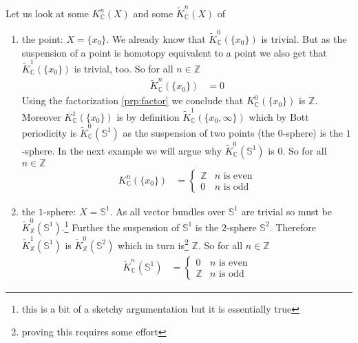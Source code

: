 \begin{exa}
\label{exa:kgrstandard}
Let us look at some $K_{\mathbb{C}}^{n}(X)$ and some $\tilde{K}_{\mathbb{C}}^{n}(X)$ of
\begin{enumerate}
\item
the point: $X = \lbrace x_{0} \rbrace$. We already know that $\tilde{K}_{\mathbb{C}}^{0}(\lbrace x_{0} \rbrace)$ is trivial. But as the suspension of a point is homotopy equivalent to a point we also get that $\tilde{K}_{\mathbb{C}}^{1}(\lbrace x_{0} \rbrace)$ is trivial, too. So for all $n \in \mathbb{Z}$
\begin{align*}
  \tilde{K}_{\mathbb{C}}^{n}(\lbrace x_{0} \rbrace)
  &=
  0
\end{align*}
    Using the factorization \ref{prp:factor} we conclude that $K_{\mathbb{C}}^{0}(\lbrace x_{0} \rbrace)$ is $\mathbb{Z}$. Moreover $K_{\mathbb{C}}^{1}(\lbrace x_{0} \rbrace)$ is by definition $\tilde{K}_{\mathbb{C}}^{1}(\lbrace x_{0}, \infty  \rbrace)$ which by Bott periodicity is $\tilde{K}_{\mathbb{C}}^{0}(\mathbb{S}^{1})$ as the suspension of two points (the $0$-sphere) is the $1$-sphere. In the next example we will argue why $\tilde{K}_{\mathbb{C}}^{0}(\mathbb{S}^{1})$ is $0$. So for all $n \in \mathbb{Z}$
\begin{align*}
  K_{\mathbb{C}}^{n}(\lbrace x_{0} \rbrace)
  &=
  \begin{cases}
    \mathbb{Z}
    &
    \text{$n$ is even}
    \\
    0
    &
    \text{$n$ is odd}
  \end{cases}
\end{align*}
\item
  the $1$-sphere: $X = \mathbb{S}^{1}$. As all vector bundles over $\mathbb{S}^{1}$ are trivial so must be $\tilde{K}_{\mathbb{X}}^{0}(\mathbb{S}^{1})$.\footnote{this is a bit of a sketchy argumentation but it is essentially true} Further the suspension of $\mathbb{S}^{1}$ is the $2$-sphere $\mathbb{S}^{2}$. Therefore $\tilde{K}_{\mathbb{X}}^{1}(\mathbb{S}^{1})$ is $\tilde{K}_{\mathbb{X}}^{0}(\mathbb{S}^{2})$ which in turn is\footnote{proving this requires some effort} $\mathbb{Z}$. So for all $n \in \mathbb{Z}$
\begin{align*}
  \tilde{K}_{\mathbb{C}}^{n}(\mathbb{S}^{1})
  &=
  \begin{cases}
    0
    &
    \text{$n$ is even}
    \\
    \mathbb{Z}
    &
    \text{$n$ is odd}
  \end{cases}
\end{align*}

\end{enumerate}
\end{exa}
